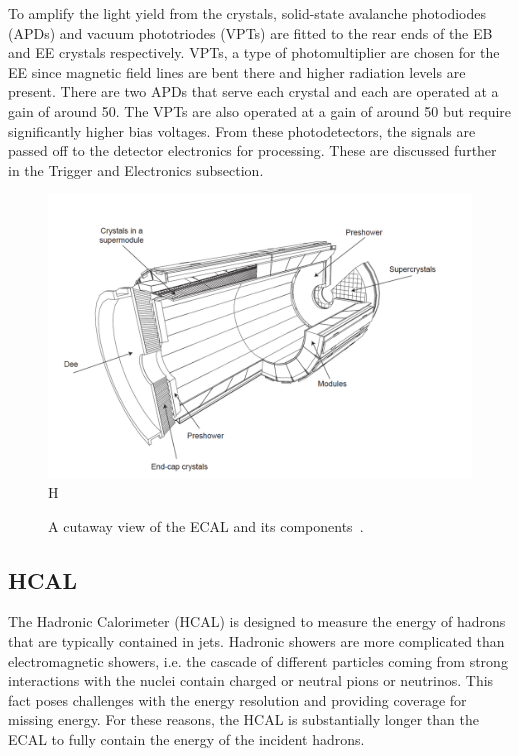 To amplify the light yield from the crystals, solid-state avalanche photodiodes (APDs) and vacuum phototriodes (VPTs) are fitted to the rear ends of the EB and EE crystals respectively. VPTs, a type of photomultiplier are chosen for the EE since magnetic field lines are bent there and higher radiation levels are present. There are two APDs that serve each crystal and each are operated at a gain of around 50. The VPTs are also operated at a gain of around 50 but require significantly higher bias voltages. From these photodetectors, the signals are passed off to the detector electronics for processing. These are discussed further in the Trigger and Electronics subsection. 

\begin{figure}[tbp!]
\begin{center}
\includegraphics[scale=0.7]{fig/cutawayECAL.png}H
\end{center}
\caption{A cutaway view of the ECAL and its components~\cite{Chatrchyan:2008aa}.
}
\label{fig:cutawayECAL}
\end{figure}


\subsection{HCAL}

The Hadronic Calorimeter (HCAL) is designed to measure the energy of hadrons that are typically contained in jets. Hadronic showers are more complicated than electromagnetic showers, i.e. the cascade of different particles coming from strong interactions with the nuclei contain charged or neutral pions or neutrinos. This fact poses challenges with the energy resolution and providing coverage for missing energy. For these reasons, the HCAL is substantially longer than the ECAL to fully contain the energy of the incident hadrons. 

